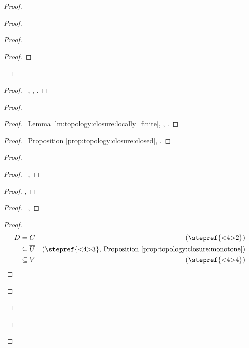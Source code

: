 \documentclass{report}
\theoremstyle{definition}
\begin{document}
\begin{proof}
\begin{proof}
\begin{proof}
\begin{proof}
      \end{proof}
    \end{proof}
    \begin{proof}
      \pf\ , , .
    \end{proof}
    \begin{proof}
      \begin{proof}
        \pf\ Lemma \ref{lm:topology:closure:locally_finite}, , .
      \end{proof}
      \begin{proof}
        \pf\ Proposition \ref{prop:topology:closure:closed}, .
      \end{proof}
      \begin{proof}
        \begin{proof}
          \pf\ , 
        \end{proof}
        \begin{proof}
          \pf {}, 
        \end{proof}
        \begin{proof}
          \pf\ , 
        \end{proof}
        \begin{proof}
          \pf
          \begin{align*}
            D & = \overline{C} & (\text{\stepref{<4>2}}) \\
            & \subseteq \overline{U} & (\text{\stepref{<4>3}, Proposition \ref{prop:topology:closure:monotone}})\\
            & \subseteq V & (\text{\stepref{<4>4}})
          \end{align*}
        \end{proof}

\end{proof}
\end{proof}
\end{proof}
\end{proof}
\end{document}
